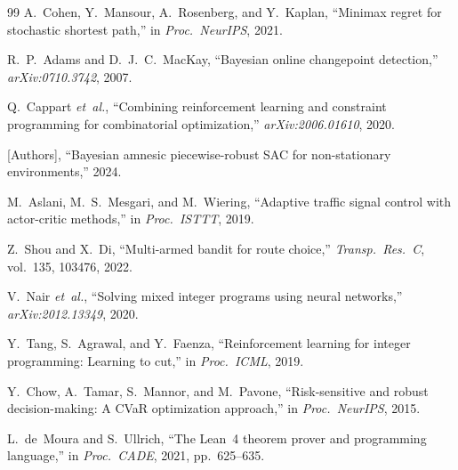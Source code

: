 \documentclass[journal]{IEEEtran}
\begin{document}
\begin{thebibliography}{99}
A.~Cohen, Y.~Mansour, A.~Rosenberg, and Y.~Kaplan, ``Minimax regret for stochastic shortest path,'' in \emph{Proc.\ NeurIPS}, 2021.

R.~P.~Adams and D.~J.~C.~MacKay, ``Bayesian online changepoint detection,'' \emph{arXiv:0710.3742}, 2007.

Q.~Cappart \emph{et~al.}, ``Combining reinforcement learning and constraint programming for combinatorial optimization,'' \emph{arXiv:2006.01610}, 2020.

[Authors], ``Bayesian amnesic piecewise-robust SAC for non-stationary environments,'' 2024.

M.~Aslani, M.~S.~Mesgari, and M.~Wiering, ``Adaptive traffic signal control with actor-critic methods,'' in \emph{Proc.\ ISTTT}, 2019.

Z.~Shou and X.~Di, ``Multi-armed bandit for route choice,'' \emph{Transp.\ Res.\ C}, vol.~135, 103476, 2022.

V.~Nair \emph{et~al.}, ``Solving mixed integer programs using neural networks,'' \emph{arXiv:2012.13349}, 2020.

Y.~Tang, S.~Agrawal, and Y.~Faenza, ``Reinforcement learning for integer programming: Learning to cut,'' in \emph{Proc.\ ICML}, 2019.

Y.~Chow, A.~Tamar, S.~Mannor, and M.~Pavone, ``Risk-sensitive and robust decision-making: A CVaR optimization approach,'' in \emph{Proc.\ NeurIPS}, 2015.

L.~de~Moura and S.~Ullrich, ``The Lean~4 theorem prover and programming language,'' in \emph{Proc.\ CADE}, 2021, pp.~625--635.

\end{thebibliography}
\end{document}
